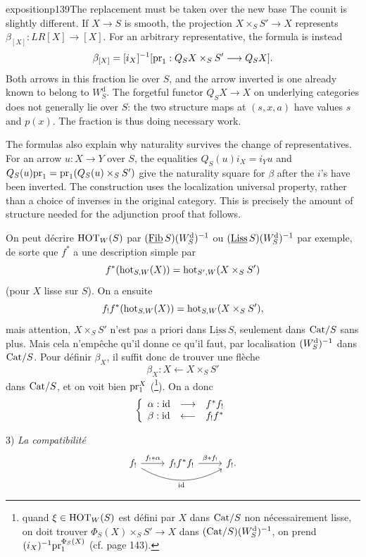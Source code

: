 \begin{dcomment}{exposition}{p139}{The replacement must be taken over the new base}
The counit is slightly different. If $X\longrightarrow S$ is smooth, the projection $X\times_SS'\longrightarrow X$ represents $\beta_{[X]}:LR[X]\longrightarrow[X]$. For an arbitrary representative, the formula is instead
\[
 \beta_{[X]}=[i_X]^{-1}
 [\mathrm{pr}_1:Q_SX\times_SS'\longrightarrow Q_SX].
\]
Both arrows in this fraction lie over $S$, and the arrow inverted is one already known to belong to $W_S^{\mathrm d}$. The forgetful functor $Q_SX\longrightarrow X$ on underlying categories does not generally lie over $S$: the two structure maps at $(s,x,a)$ have values $s$ and $p(x)$. The fraction is thus doing necessary work.

The formulas also explain why naturality survives the change of representatives. For an arrow $u:X\longrightarrow Y$ over $S$, the equalities $Q_S(u)i_X=i_Yu$ and $Q_S(u)\mathrm{pr}_1=\mathrm{pr}_1(Q_S(u)\times_SS')$ give the naturality square for $\beta$ after the $i$'s have been inverted. The construction uses the localization universal property, rather than a choice of inverses in the original category. This is precisely the amount of structure needed for the adjunction proof that follows.
\end{dcomment}


On peut décrire $\mathrm{HOT}_W(S)$ par $(\underline{\mathrm{Fib}}\,S)(W^{\mathrm{d}}_S)^{-1}$ ou $(\underline{\mathrm{Liss}}\,S)(W^{\mathrm{d}}_S)^{-1}$ par exemple, de sorte que $f^*$ a une description simple par
\[
f^*(\mathrm{hot}_{S,W}(X)) = \mathrm{hot}_{S',W}(X\times_S S')
\]
(pour $X$ lisse sur $S$). On a ensuite
\[
f_!f^*(\mathrm{hot}_{S,W}(X)) = \mathrm{hot}_{S,W}(X\times_S S'),
\]
mais attention, $X\times_S S'$ n'est pas a priori dans $\underline{\mathrm{Liss}}\,S$, seulement dans $\mathrm{Cat}/S$ sans plus. Mais cela n'empêche qu'il donne ce qu'il faut, par localisation $(W^{\mathrm{d}}_S)^{-1}$ dans $\mathrm{Cat}/S$. Pour définir $\beta_X$, il suffit donc de trouver une flèche
\[
\beta_X : X \longleftarrow X\times_S S'
\]
dans $\mathrm{Cat}/S$, et on voit bien $\mathrm{pr}_1^X$ (\footnote[68]{quand $\xi\in\mathrm{HOT}_W(S)$ est défini par $X$ dans $\mathrm{Cat}/S$ non nécessairement lisse, on doit trouver $\Phi_S(X)\times_S S'\longrightarrow X$ dans $(\mathrm{Cat}/S)(W^{\mathrm{d}}_S)^{-1}$, on prend $(i_X)^{-1}\mathrm{pr}_1^{\Phi_S(X)}$ (cf. page 143).}). On a donc
\[
\left\{
\begin{array}{lcl}
\alpha : \mathrm{id} & \longrightarrow & f^*f_! \\
\beta : \mathrm{id} & \longleftarrow & f_!f^*
\end{array}
\right.
\]

3) \textit{La compatibilité}
\[
\begin{tikzcd}
f_! \arrow[r, "f_!*\alpha"] \arrow[rr, bend right, "\id"'] & f_!f^*f_! \arrow[r, "\beta*f_!"] & f_!.
\end{tikzcd}
\]

